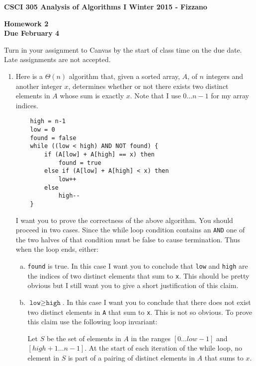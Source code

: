\documentclass[11pt]{article}
\begin{document}
\textbf{CSCI 305 Analysis of Algorithms I \hfill Winter 2015 - Fizzano}

\begin{center}
\textbf{Homework 2 \\ Due February 4}
\end{center}

Turn in your assignment to Canvas by the start of class time on the due date.  Late assignments are not accepted.  

\begin{enumerate}

\item Here is a $\Theta(n)$ algorithm that, given a sorted array,
$A$, of $n$ integers and another integer $x$, determines whether or
not there exists two distinct elements in $A$ whose sum is exactly
$x$. Note that I use $0 \ldots n-1$ for my array indices.

\begin{verbatim}
    high = n-1
    low = 0
    found = false
    while ((low < high) AND NOT found) {
        if (A[low] + A[high] == x) then 
            found = true
        else if (A[low] + A[high] < x) then 
            low++
        else 
            high--
    }
\end{verbatim}

I want you to prove the correctness of the above algorithm.  You should proceed in two cases.  Since the while loop condition contains an \texttt{AND} one of the two halves of that condition must be false to cause termination.  Thus when the loop ends, either: 

\begin{enumerate}[a)]
    \item  \texttt{found} is true.  In this case I want you to conclude that \texttt{low} and \texttt{high} are the indices of two distinct elements that sum to \texttt{x}.  This should be pretty obvious but I still want you to give a short justification of this claim.  
    
    \item  $\texttt{low} \geq \texttt{high}$. In this case I want you to conclude that there does not exist two distinct elements in \texttt{A} that sum to \texttt{x}.  This is not so obvious.  To prove this claim use the following loop invariant:
    
\begin{center}
\begin{minipage}{14cm}
Let $S$ be the set of elements in $A$ in the ranges $[0 \dots low-1]$ and $[high+1 \dots n-1]$.
At the start of each iteration of the while loop, no element in $S$ is part of a pairing of distinct elements in $A$ that sums to $x$.  
\end{minipage}
\end{center}
    

\end{enumerate}
\end{enumerate}
\end{document}
